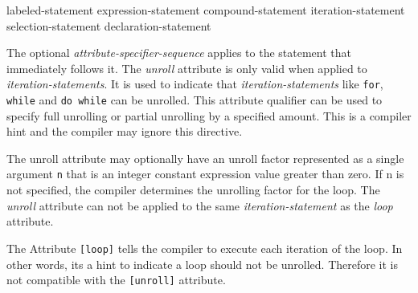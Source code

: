 \begin{grammar}
    \br
    labeled-statement\br
     expression-statement\br
     compound-statement\br
     iteration-statement\br
     selection-statement\br
    declaration-statement
\end{grammar}
\p The optional \textit{attribute-specifier-sequence} applies to the statement 
that immediately follows it.
\p The \textit{unroll}  attribute is only valid when applied to 
\textit{iteration-statements}. It is used to indicate that 
\textit{iteration-statements} like \texttt{for}, \texttt{while} and 
\texttt{do while} can be unrolled. This attribute qualifier can be used to 
specify full unrolling or partial unrolling by a specified amount. This is a 
compiler hint  and the compiler may ignore this directive.

\p The unroll attribute may optionally have an unroll factor represented as a 
single argument \texttt{n}  that is an integer constant expression value 
greater than zero. If n is not  specified, the compiler determines the 
unrolling factor for the loop. The \textit{unroll} attribute can not be applied
 to the same \textit{iteration-statement} as the \textit{loop} attribute.

\p The Attribute \texttt{[loop]} tells the compiler to execute each iteration 
of the loop. In other words, its a hint to indicate a loop should not be 
unrolled. Therefore it is not compatible with the \texttt{[unroll]} attribute.
